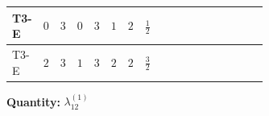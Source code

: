 \documentclass[8pt]{article}
\begin{document}
\begin{landscape}
\begin{longtable}{@{}llcccccc >{\raggedright\arraybackslash}p{0.21\linewidth} >{\raggedright\arraybackslash}p{0.21\linewidth} >{\raggedright\arraybackslash}p{0.21\linewidth}@{}}
T3-E & $0$ & $3$ & $0$ & $3$ & $1$ & $2$ & $\frac{1}{2}$ & \scriptsize\adjustbox{max width=\linewidth}{$\begin{gathered} {\lambda_{12}^{(1)}} \left(2 T_{\nu}^{(1)}+2 T_{\nu}^{(2)}+\frac{16 {\lambda_{12}^{(\times)}}}{3}+4 {\lambda_{S_1}^{(A)}}+4 {\lambda_{S_2}^{(A)}}\right)\end{gathered}$} & \scriptsize\adjustbox{max width=\linewidth}{$\begin{gathered} +{\lambda_{12}^{(\times)}} \left(\frac{4}{3} T_{\nu}^{(1)}+\frac{4}{3} T_{\nu}^{(2)}\right)\end{gathered}$} & \scriptsize\adjustbox{max width=\linewidth}{$\begin{gathered} +\frac{4}{3} {\lambda_5} \left({\lambda_5}\right)^{*}\end{gathered}$} \\
\midrule
T3-E & $2$ & $3$ & $1$ & $3$ & $2$ & $2$ & $\frac{3}{2}$ & \scriptsize\adjustbox{max width=\linewidth}{$\begin{gathered} {\lambda_{12}^{(1)}} \left(2 T_{\nu}^{(1)}+2 T_{\nu}^{(2)}+\frac{16 {\lambda_{12}^{(\times)}}}{3}+4 {\lambda_{S_1}^{(A)}}+4 {\lambda_{S_2}^{(A)}}\right)\end{gathered}$} & \scriptsize\adjustbox{max width=\linewidth}{$\begin{gathered} +{\lambda_{12}^{(\times)}} \left(\frac{4}{3} T_{\nu}^{(1)}+\frac{4}{3} T_{\nu}^{(2)}\right)\end{gathered}$} & \scriptsize\adjustbox{max width=\linewidth}{$\begin{gathered} +\frac{4}{3} {\lambda_5} \left({\lambda_5}\right)^{*}\end{gathered}$} \\
\midrule
\bottomrule
\end{longtable}
\clearpage
\noindent\textbf{Quantity: }$\lambda_{12}^{(1)}$\par\smallskip

\end{landscape}
\end{document}
